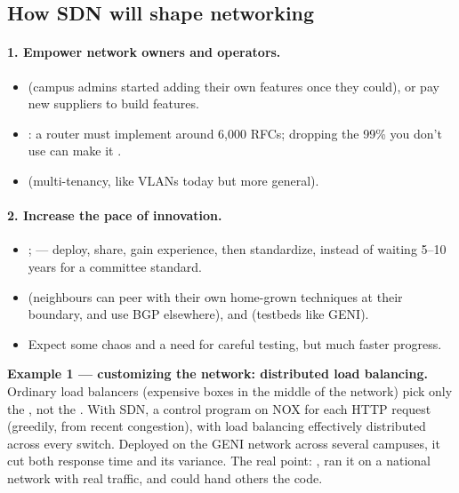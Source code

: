 \subsection{How SDN will shape networking}
\paragraph{1. Empower network owners and operators.}
\begin{itemize}
\item {} (campus admins started adding their own features once they could), or pay new suppliers to build features.
\item {}: a router must implement around 6,000 RFCs; dropping the 99\% you don't use can make it .
\item {} (multi-tenancy, like VLANs today but more general).
\end{itemize}
\paragraph{2. Increase the pace of innovation.}
\begin{itemize}
\item {};  --- deploy, share, gain experience, then standardize, instead of waiting 5--10 years for a committee standard.
\item {} (neighbours can peer with their own home-grown techniques at their boundary, and use BGP elsewhere), and  (testbeds like GENI).
\item Expect some chaos and a need for careful testing, but much faster progress.
\end{itemize}
\textbf{Example 1 --- customizing the network: distributed load balancing.} Ordinary load balancers (expensive boxes in the middle of the network) pick only the , not the . With SDN, a control program on NOX  for each HTTP request (greedily, from recent congestion), with load balancing effectively distributed across every switch. Deployed on the GENI network across several campuses, it cut both response time and its variance. The real point: , ran it on a national network with real traffic, and could hand others the code.

